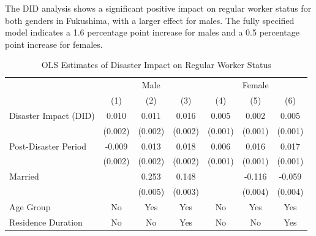\documentclass[serif, aspectratio=169]{beamer}
\begin{document}
\begin{frame}[label=regular_status]

The DID analysis shows a significant positive impact on regular worker status for both genders in Fukushima, with a larger effect for males. The fully specified model indicates a 1.6 percentage point increase for males and a 0.5 percentage point increase for females.

\begin{table}[htbp]
\centering
\caption{OLS Estimates of Disaster Impact on Regular Worker Status}

\vspace{-0.2cm}


\begin{tabular}{@{}l*{6}{c}@{}}
          &\multicolumn{3}{c}{Male}                                &\multicolumn{3}{c}{Female}                              \\\cmidrule(lr){2-4}\cmidrule(lr){5-7}
          &\multicolumn{1}{c}{(1)}         &\multicolumn{1}{c}{(2)}         &\multicolumn{1}{c}{(3)}         &\multicolumn{1}{c}{(4)}         &\multicolumn{1}{c}{(5)}         &\multicolumn{1}{c}{(6)}         \\
\toprule
Disaster Impact (DID)&    0.010\sym{***}&    0.011\sym{***}&    0.016\sym{***}&    0.005\sym{***}&    0.002         &    0.005\sym{***}\\
          &  (0.002)         &  (0.002)         &  (0.002)         &  (0.001)         &  (0.001)         &  (0.001)         \\
\addlinespace
Post-Disaster Period&   -0.009\sym{***}&    0.013\sym{***}&    0.018\sym{***}&    0.006\sym{***}&    0.016\sym{***}&    0.017\sym{***}\\
          &  (0.002)         &  (0.002)         &  (0.002)         &  (0.001)         &  (0.001)         &  (0.001)         \\
\addlinespace
Married   &                  &    0.253\sym{***}&    0.148\sym{***}&                  &   -0.116\sym{***}&   -0.059\sym{***}\\
          &                  &  (0.005)         &  (0.003)         &                  &  (0.004)         &  (0.004)         \\
\midrule
Age Group &       No         &      Yes         &      Yes         &       No         &      Yes         &      Yes         \\
Residence Duration&       No         &       No         &      Yes         &       No         &       No         &      Yes         \\

\end{tabular}
\end{table}
\end{frame}
\end{document}
